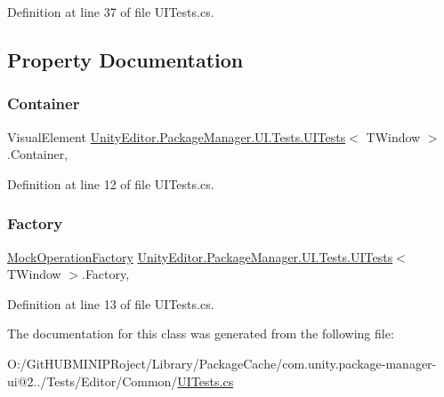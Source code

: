 Definition at line 37 of file U\+I\+Tests.\+cs.



\subsection{Property Documentation}
\mbox{\label{class_unity_editor_1_1_package_manager_1_1_u_i_1_1_tests_1_1_u_i_tests_a85feae7c0dc564b712cab9392bd14e68}} 
\subsubsection{\texorpdfstring{Container}{Container}}
{\footnotesize\ttfamily Visual\+Element \mbox{\hyperlink{class_unity_editor_1_1_package_manager_1_1_u_i_1_1_tests_1_1_u_i_tests}{Unity\+Editor.\+Package\+Manager.\+U\+I.\+Tests.\+U\+I\+Tests}}$<$ T\+Window $>$.Container\hspace{0.3cm}{\ttfamily [get]}, {\ttfamily [protected]}}



Definition at line 12 of file U\+I\+Tests.\+cs.

\mbox{\label{class_unity_editor_1_1_package_manager_1_1_u_i_1_1_tests_1_1_u_i_tests_a21922bd694662931ee9b893f1734305f}} 
\subsubsection{\texorpdfstring{Factory}{Factory}}
{\footnotesize\ttfamily \mbox{\hyperlink{class_unity_editor_1_1_package_manager_1_1_u_i_1_1_tests_1_1_mock_operation_factory}{Mock\+Operation\+Factory}} \mbox{\hyperlink{class_unity_editor_1_1_package_manager_1_1_u_i_1_1_tests_1_1_u_i_tests}{Unity\+Editor.\+Package\+Manager.\+U\+I.\+Tests.\+U\+I\+Tests}}$<$ T\+Window $>$.Factory\hspace{0.3cm}{\ttfamily [get]}, {\ttfamily [protected]}}



Definition at line 13 of file U\+I\+Tests.\+cs.



The documentation for this class was generated from the following file\+:\begin{DoxyCompactItemize}
\item 
O\+:/\+Git\+H\+U\+B\+M\+I\+N\+I\+P\+Roject/\+Library/\+Package\+Cache/com.\+unity.\+package-\/manager-\/ui@2../\+Tests/\+Editor/\+Common/\mbox{\hyperlink{_u_i_tests_8cs}{U\+I\+Tests.\+cs}}\end{DoxyCompactItemize}
